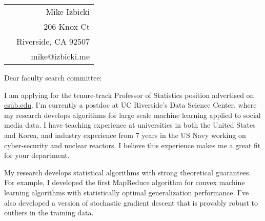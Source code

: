 \documentclass[12pt]{article}
\begin{document}
\noindent
\hspace{-0.13in}
\begin{tabularx}{1.03\textwidth}{Xr}
 & Mike Izbicki \\
 & 206 Knox Ct\\
 & Riverside, CA 92507\\
 & mike@izbicki.me\\
\end{tabularx}

\vspace{0.25in}

\setlength{\parskip}{15pt plus4mm minus3mm}

\noindent
Dear faculty search committee:

\noindent
I am applying for the tenure-track Professor of Statistics position advertised on \url{csub.edu}.
I'm currently a postdoc at UC Riverside's Data Science Center,
where my research develops algorithms for large scale machine learning applied to social media data.
I have teaching experience at universities in both the United States and Korea, and
industry experience from 7 years in the US Navy working on cyber-security and nuclear reactors.
I believe this experience makes me a great fit for your department.

\noindent
My research develops statistical algorithms with strong theoretical guarantees.
For example, I developed the first MapReduce algorithm for convex machine learning algorithms with statistically optimal generalization performance.
I've also developed a version of stochastic gradient descent that is provably robust to outliers in the training data.


\end{document}
